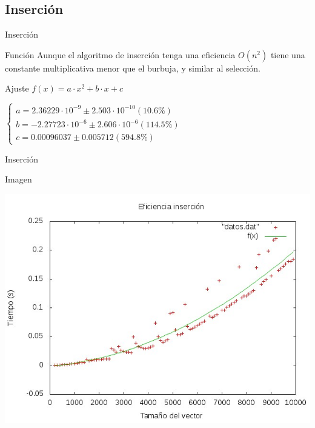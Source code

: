 \documentclass[compress]{beamer}
\begin{document}
\subsection{Inserción}
\begin{frame}{Inserción}
	\begin{block}{Función}
	Aunque el algoritmo de inserción tenga una eficiencia $O(n^2)$ tiene una constante 			multiplicativa menor que el burbuja, y similar al selección.
	\end{block}
	
	\begin{block}{Ajuste}
	$f(x) = a\cdot x^2 + b\cdot x + c$
	
	$\left\{ \begin{array}{c}
	a               = 2.36229\cdot 10^{-9}      \pm 2.503\cdot 10^{-10}    (10.6\%) \\
	b               = -2.27723\cdot 10^{-6}     \pm 2.606\cdot 10^{-6}    (114.5\%) \\
	c               = 0.00096037       \pm 0.005712     (594.8\%)
	\end{array}\right.$	
	\end{block}
\end{frame}

\begin{frame}{Inserción}
	\begin{alertblock}{Imagen}
	\begin{center}
	\includegraphics[scale=0.55]{../Graficas/Insercion/insercionO0_ruben.jpeg}
	\end{center}
	\end{alertblock}
\end{frame}
\end{document}
